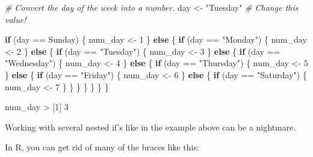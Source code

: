\documentclass[
]{book}
\newenvironment{Shaded}{\begin{snugshade}}{\end{snugshade}}
\newcommand{\CommentTok}[1]{\textcolor[rgb]{0.56,0.35,0.01}{\textit{#1}}}
\newcommand{\ControlFlowTok}[1]{\textcolor[rgb]{0.13,0.29,0.53}{\textbf{#1}}}
\newcommand{\DecValTok}[1]{\textcolor[rgb]{0.00,0.00,0.81}{#1}}
\newcommand{\NormalTok}[1]{#1}
\newcommand{\OtherTok}[1]{\textcolor[rgb]{0.56,0.35,0.01}{#1}}
\newcommand{\SpecialCharTok}[1]{\textcolor[rgb]{0.00,0.00,0.00}{#1}}
\newcommand{\StringTok}[1]{\textcolor[rgb]{0.31,0.60,0.02}{#1}}
\begin{document}
\begin{Shaded}
\begin{Highlighting}[]
\CommentTok{\# Convert the day of the week into a number.}
\NormalTok{day }\OtherTok{\textless{}{-}} \StringTok{"Tuesday"} \CommentTok{\# Change this value!}

\ControlFlowTok{if}\NormalTok{ (day }\SpecialCharTok{==} \StringTok{\textquotesingle{}Sunday\textquotesingle{}}\NormalTok{) \{}
\NormalTok{  num\_day }\OtherTok{\textless{}{-}} \DecValTok{1}
\NormalTok{\} }\ControlFlowTok{else}\NormalTok{ \{}
  \ControlFlowTok{if}\NormalTok{ (day }\SpecialCharTok{==} \StringTok{"Monday"}\NormalTok{) \{}
\NormalTok{    num\_day }\OtherTok{\textless{}{-}} \DecValTok{2}
\NormalTok{  \} }\ControlFlowTok{else}\NormalTok{ \{}
    \ControlFlowTok{if}\NormalTok{ (day }\SpecialCharTok{==} \StringTok{"Tuesday"}\NormalTok{) \{}
\NormalTok{      num\_day }\OtherTok{\textless{}{-}} \DecValTok{3}
\NormalTok{    \} }\ControlFlowTok{else}\NormalTok{ \{}
      \ControlFlowTok{if}\NormalTok{ (day }\SpecialCharTok{==} \StringTok{"Wednesday"}\NormalTok{) \{}
\NormalTok{        num\_day }\OtherTok{\textless{}{-}} \DecValTok{4}
\NormalTok{      \} }\ControlFlowTok{else}\NormalTok{ \{}
        \ControlFlowTok{if}\NormalTok{ (day }\SpecialCharTok{==} \StringTok{"Thursday"}\NormalTok{) \{}
\NormalTok{          num\_day }\OtherTok{\textless{}{-}} \DecValTok{5}
\NormalTok{        \} }\ControlFlowTok{else}\NormalTok{ \{}
          \ControlFlowTok{if}\NormalTok{ (day }\SpecialCharTok{==} \StringTok{"Friday"}\NormalTok{) \{}
\NormalTok{            num\_day }\OtherTok{\textless{}{-}} \DecValTok{6}
\NormalTok{          \} }\ControlFlowTok{else}\NormalTok{ \{}
            \ControlFlowTok{if}\NormalTok{ (day }\SpecialCharTok{==} \StringTok{"Saturday"}\NormalTok{) \{}
\NormalTok{              num\_day }\OtherTok{\textless{}{-}} \DecValTok{7}
\NormalTok{            \}}
\NormalTok{          \}}
\NormalTok{        \}}
\NormalTok{      \}}
\NormalTok{    \}}
\NormalTok{  \}}
\NormalTok{\}}

\NormalTok{num\_day}
\SpecialCharTok{\textgreater{}}\NormalTok{ [}\DecValTok{1}\NormalTok{] }\DecValTok{3}
\end{Highlighting}
\end{Shaded}

Working with several nested if's like in the example above can be a nightmare.

In R, you can get rid of many of the braces like this:
\end{document}
